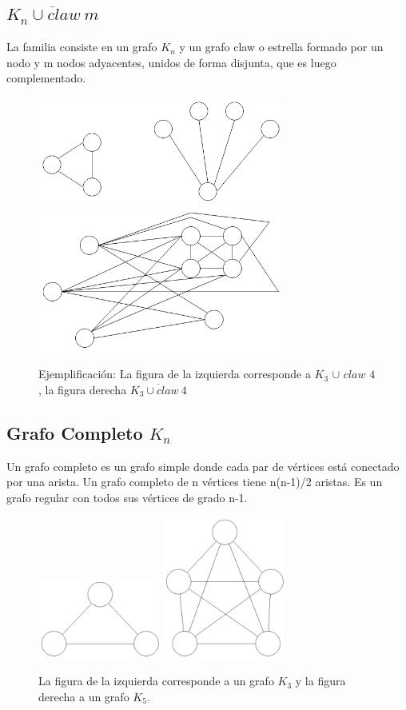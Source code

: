 \subsection{$\overline{K_n \cup claw \: m}$}
La familia consiste en un grafo $K_n$ y un grafo claw o estrella formado por un nodo y m nodos adyacentes, 
unidos de forma disjunta, que es luego complementado.
\begin{figure}[H]
\includegraphics[width=80mm]{K3UC4.png}
\includegraphics[width=80mm]{K3UC4Complemento.png}
\caption{Ejemplificación: La figura de la izquierda corresponde a $K_3$ $\cup$ $claw$ $4$, 
la figura derecha $\overline{K_3 \cup claw \: 4}$}
\label{overflow}
\end{figure}

\subsection{Grafo Completo $K_n$}
Un grafo completo es un grafo simple donde cada par de vértices está conectado por una arista.
Un grafo completo de n vértices tiene n(n-1)/2 aristas.
Es un grafo regular con todos sus vértices de grado n-1.

\begin{figure}[H]
\centering
\includegraphics[width=40mm]{K3.png}
\includegraphics[width=40mm]{K5.png}
\caption{La figura de la izquierda corresponde a un grafo $K_3$ y la figura derecha a un grafo $K_5$.}
\label{overflow}
\end{figure}

